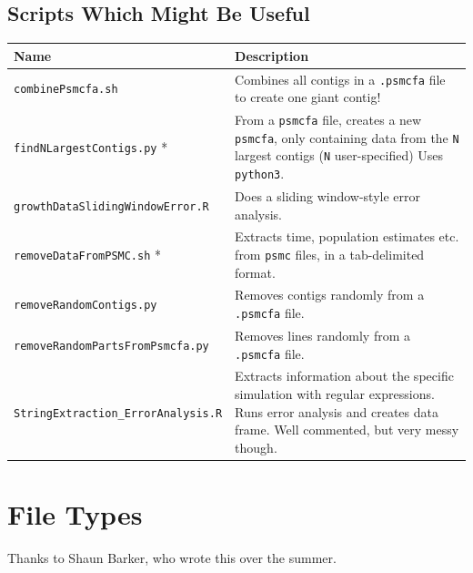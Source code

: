 \documentclass[11pt,a4paper]{article}
\begin{document}
\subsection{Scripts Which Might Be Useful}
\begin{table}[h]
\begin{tabular}{p{6.5cm}p{8.5cm}}
  \hline
  \textbf{Name} & \textbf{Description} \\ 
  \hline
  \texttt{combinePsmcfa.sh} & Combines all contigs in a \verb|.psmcfa| file to create one giant contig! \\ \hline
  \parbox[t]{5cm}{\texttt{findNLargestContigs.py} *} & From a \texttt{psmcfa} file, creates a new \texttt{psmcfa}, only containing data from the \texttt{N} largest contigs (\texttt{N} user-specified) Uses \texttt{python3}.\\ \hline
  \texttt{growthDataSlidingWindowError.R} & Does a sliding window-style error analysis. \\ \hline
  \parbox[t]{5cm}{\texttt{removeDataFromPSMC.sh} *} & Extracts time, population estimates etc. from \texttt{psmc} files, in a tab-delimited format.\\ \hline
  \texttt{removeRandomContigs.py} & Removes contigs randomly from a \verb|.psmcfa| file.\\ \hline  
  \texttt{removeRandomPartsFromPsmcfa.py} & Removes lines randomly from a \verb|.psmcfa| file.\\ \hline  
  \parbox[t]{5cm}{\texttt{StringExtraction\_ErrorAnalysis.R}} & Extracts information about the specific simulation with regular expressions. Runs error analysis and creates data frame. Well commented, but very messy though.\\ \hline
\end{tabular}
\end{table}


\appendix
\section{File Types}
Thanks to Shaun Barker, who wrote this over the summer.
\end{document}
